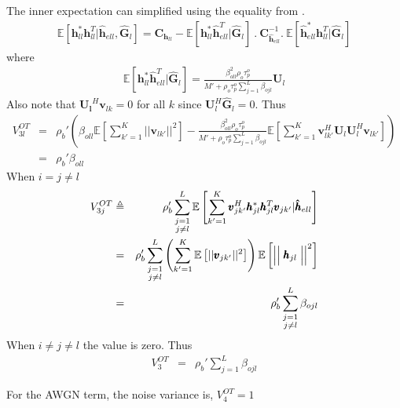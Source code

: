 \documentclass[10pt, a4paper, twoside,fleqn]{article}
\begin{document}
The inner expectation can simplified using the equality from \cite{bib:rmtBook}.
\begin{eqnarray}
	\mathbb{E}[\pmb{h}_{ll}^*\pmb{h}^T_{ll}|\pmb{\hat h}_{ell}, \pmb{\widehat{G}}_{l}] = \pmb{C}_{\pmb{h}_{ll}}-\mathbb{E}[\pmb{h}_{ll}^* \pmb{\hat h}^T_{ell}| \pmb{\widehat{G}}_{l}] \ . \ \pmb{C}_{\pmb{\hat h}_{ell}}^{-1} .\ \mathbb{E}[\pmb{\hat h}_{ell}^* \pmb{h}_{ll}^T| \pmb{\widehat{G}}_{l}]
\end{eqnarray}
where
\begin{eqnarray}
	\mathbb{E}[\pmb{h}_{ll}^* \pmb{\hat h}_{ell}^T | \pmb{\widehat{G}}_{l}] = \frac{\beta_{oll}^{2}\rho_o\tau_p^o}{M'+\rho_o\tau_p^o\sum\limits_{j=1}^{L}\beta_{ojl}}\pmb{U}_l
\end{eqnarray}
Also note that $\pmb{U_l}^H\pmb{v}_{lk}=0$ for all $k$ since $\pmb{U}_l^H\pmb{\widehat{G}}_l=0$. Thus
\begin{eqnarray}\label{eqn:otv3}
	V_{3l}^{OT} &=& \rho_b'\left( \beta_{oll} \mathbb{E}\left[\sum_{k'=1}^{K}||\pmb{v}_{lk'}||^2\right]
					- \frac{\beta_{oll}^{2}\rho_o\tau_p^o}{M'+\rho_o\tau_p^o\sum\limits_{j=1}^{L}\beta_{ojl}} \mathbb{E}\left[\sum_{k'=1}^{K} \pmb{v}_{lk'}^H \pmb{U}_l \pmb{U}_l^H \pmb{v}_{lk'}\right]\right) \nonumber \\
        &=& \rho_b'\beta_{oll}
\end{eqnarray}
When $i=j\neq l$
\begin{eqnarray}\label{eqn:v3jot}
V_{3j}^{OT} &\triangleq& \rho_b' \sum_{\substack{j=1 \\ j\neq l}}^{L} \mathbb{E}\left[\sum_{k'=1}^{K} \pmb{v}_{jk'}^H \pmb{h}_{jl}^*  \pmb{h}_{jl}^T \pmb{v}_{jk'}| \pmb{\hat h}_{ell} \right] \nonumber \\
           &=&  \rho_b' \sum_{\substack{j=1 \\ j\neq l}}^{L}\left(\sum_{k'=1}^{K} \mathbb{E}\left[||\pmb{v}_{jk'}||^2\right]\right)\mathbb{E}\left[ \Bigm|\Bigm|\pmb{h}_{jl}\Bigm|\Bigm|^2\right] \nonumber \\
           &=&\rho_b' \sum_{\substack{j=1 \\ j\neq l}}^{L}\beta_{ojl}
\end{eqnarray}
When $i\neq j\neq l$ the value is zero. Thus
\begin{eqnarray}
V_3^{OT} &=&\rho_b' \sum_{j=1}^{L}\beta_{ojl}
\end{eqnarray}

For the AWGN term, the noise variance is, $V_4^{OT} = 1$
\end{document}

